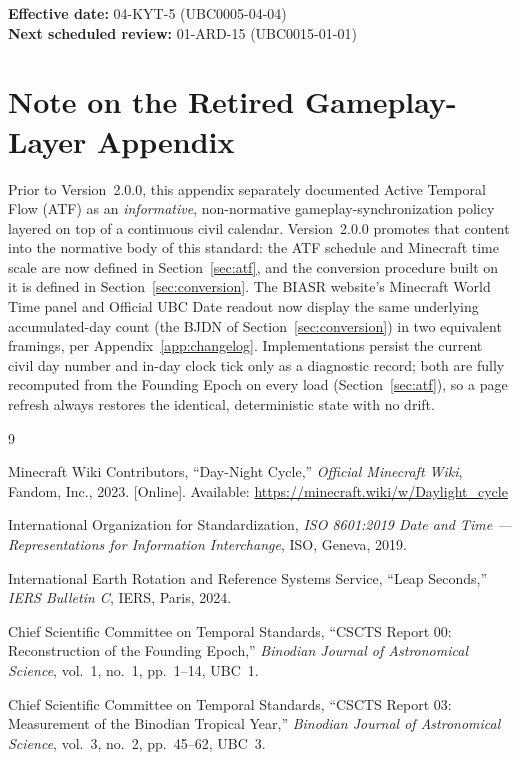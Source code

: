 \documentclass[journal,twoside]{IEEEtran}
\begin{document}
\noindent \textbf{Effective date:} 04-KYT-5 (UBC0005-04-04)\\
\textbf{Next scheduled review:} 01-ARD-15 (UBC0015-01-01)

\section{Note on the Retired Gameplay-Layer Appendix}

Prior to Version~2.0.0, this appendix separately documented Active Temporal Flow (ATF) as
an \emph{informative}, non-normative gameplay-synchronization policy layered on top of a
continuous civil calendar. Version~2.0.0 promotes that content into the normative body of
this standard: the ATF schedule and Minecraft time scale are now defined in
Section~\ref{sec:atf}, and the conversion procedure built on it is defined in
Section~\ref{sec:conversion}. The BIASR website's Minecraft World Time panel and Official
UBC Date readout now display the same underlying accumulated-day count (the BJDN of
Section~\ref{sec:conversion}) in two equivalent framings, per Appendix~\ref{app:changelog}.
Implementations persist the current civil day number and in-day clock tick only as a
diagnostic record; both are fully recomputed from the Founding Epoch on every load
(Section~\ref{sec:atf}), so a page refresh always restores the identical, deterministic
state with no drift.

\begin{thebibliography}{9}

Minecraft Wiki Contributors,
``Day-Night Cycle,''
\textit{Official Minecraft Wiki},
Fandom, Inc., 2023.
[Online]. Available: \url{https://minecraft.wiki/w/Daylight_cycle}

International Organization for Standardization,
\textit{ISO 8601:2019 Date and Time --- Representations for Information Interchange},
ISO, Geneva, 2019.

International Earth Rotation and Reference Systems Service,
``Leap Seconds,''
\textit{IERS Bulletin C}, IERS, Paris, 2024.

Chief Scientific Committee on Temporal Standards,
``CSCTS Report 00: Reconstruction of the Founding Epoch,''
\textit{Binodian Journal of Astronomical Science}, vol.~1, no.~1, pp.~1--14, UBC~1.

Chief Scientific Committee on Temporal Standards,
``CSCTS Report 03: Measurement of the Binodian Tropical Year,''
\textit{Binodian Journal of Astronomical Science}, vol.~3, no.~2, pp.~45--62, UBC~3.

\end{thebibliography}
\end{document}
